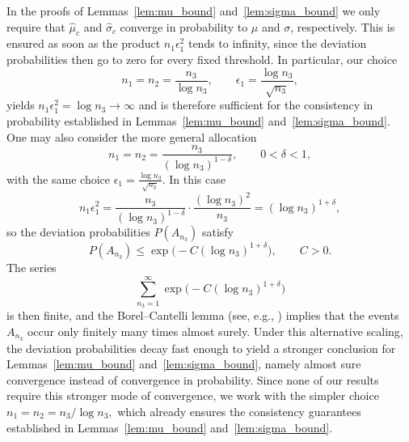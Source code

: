 \documentclass[10pt]{article} %
\theoremstyle{plain}
\theoremstyle{definition}
\theoremstyle{remark}
\newcommand{\rkcomment}[1]{\textcolor{blue}{RK: #1}}
\begin{document}
\begin{remark}
In the proofs of Lemmas~\ref{lem:mu_bound} and~\ref{lem:sigma_bound} we only require that
$\hat{\mu}_c$ and $\hat{\sigma}_c$ converge in probability to $\mu$ and $\sigma$,
respectively. This is ensured as soon as the product $n_1 \epsilon_1^2$ tends to infinity, since the
deviation probabilities then go to zero for every fixed threshold. In particular, our choice
\[
n_1 = n_2 = \frac{n_3}{\log n_3}, 
\qquad 
\epsilon_1 = \frac{\log n_3}{\sqrt{n_3}},
\]
yields $n_1 \epsilon_1^2 = \log n_3 \to \infty$ and is therefore sufficient for the
consistency in probability established in Lemmas~\ref{lem:mu_bound} and~\ref{lem:sigma_bound}.
One may also consider the more general allocation
\[
n_1 = n_2 = \frac{n_3}{(\log n_3)^{1-\delta}}, 
\qquad 0 < \delta < 1,
\]
with the same choice $\epsilon_1 = \frac{\log n_3}{\sqrt{n_3}}$.
In this case
\[
n_1 \epsilon_1^2
=
\frac{n_3}{(\log n_3)^{1-\delta}}
\cdot
\frac{(\log n_3)^2}{n_3}
=
(\log n_3)^{1+\delta},
\]
so the deviation probabilities $P(A_{n_3})$ satisfy
\[
P(A_{n_3}) \leq \exp\!\big( - C (\log n_3)^{1+\delta} \big), \qquad C>0.
\]
The series
\[
\sum_{n_3=1}^\infty \exp\!\big( - C (\log n_3)^{1+\delta} \big)
\]
is then finite,
and the Borel--Cantelli lemma (see, e.g., \cite[Theorem~2.3.7]{durrett2019probability})
implies that the events $A_{n_3}$ occur only finitely many times almost surely.
Under this alternative scaling, the deviation probabilities decay fast enough to
yield a stronger conclusion for Lemmas~\ref{lem:mu_bound} and~\ref{lem:sigma_bound},
namely almost sure convergence instead of convergence in probability.
Since none of our results require this stronger mode of convergence, we work with 
the simpler choice 
\(
n_1 = n_2 = n_3 / \log n_3,
\)
which already ensures the consistency guarantees established in 
Lemmas~\ref{lem:mu_bound} and~\ref{lem:sigma_bound}.
\end{remark}



\end{document}
